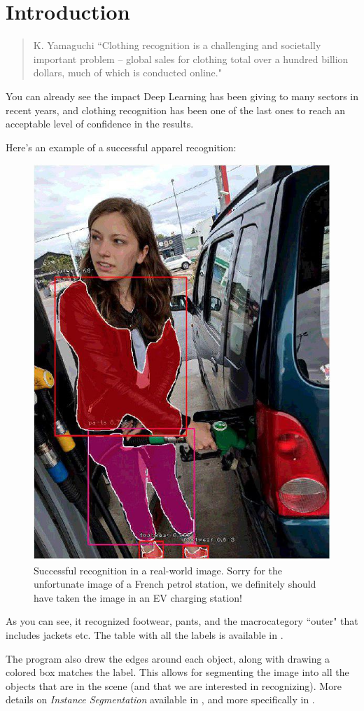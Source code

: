 \chapter*{Introduction}


\begin{quote}{K. Yamaguchi}
	“Clothing recognition is a challenging and societally important problem – global sales for clothing total over a hundred billion dollars, much of which is conducted online." \cite{yamaguchi2013paper}
\end{quote}

You can already see the impact Deep Learning has been giving to many sectors in recent years, and clothing recognition has been one of the last ones to reach an acceptable level of confidence in the results.

Here's an example of a successful apparel recognition:

\begin{figure}[H]
	\centering
	\includegraphics[width=.5\linewidth]{images/difficultscenario.jpg}
	\caption{Successful recognition in a real-world image. Sorry for the unfortunate image of a French petrol station, we definitely should have taken the image in an EV charging station!}
\end{figure}

As you can see, it recognized footwear, pants, and the macrocategory “outer" that includes jackets etc. The table with all the labels is available in .

The program also drew the edges around each object, along with drawing a colored box matches the label. This allows for segmenting the image into all the objects that are in the scene (and that we are interested in recognizing).
More details on \emph{Instance Segmentation} available in , and more specifically in .

